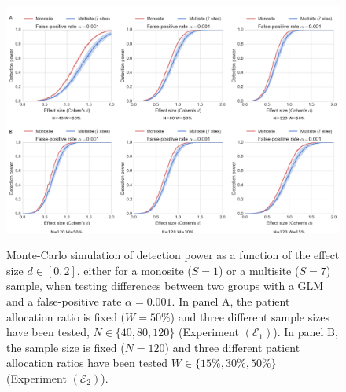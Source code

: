 \documentclass[authoryear]{elsarticle}
\begin{document}
\begin{figure}[tbp]
\centering
{\includegraphics[width=\textwidth]{../figures/simulations_real_7sites.png}}

\caption{
Monte-Carlo simulation of detection power as a function of the effect size $d\in[0,2]$, either for a monosite ($S=1$) or a multisite ($S=7$) sample, when testing differences between two groups with a GLM and a false-positive rate $\alpha=0.001$. In panel A, the patient allocation ratio is fixed ($W=50\%$) and three different sample sizes have been tested, $N\in\{40, 80, 120\}$ (Experiment $(\mathcal{E}_1)$). In panel B, the sample size is fixed ($N=120$) and three different patient allocation ratios have been tested $W\in \{15\%, 30\%,50\%\}$ (Experiment $(\mathcal{E}_2)$).
}
\label{fig_real_sim}
\end{figure}
\end{document}
